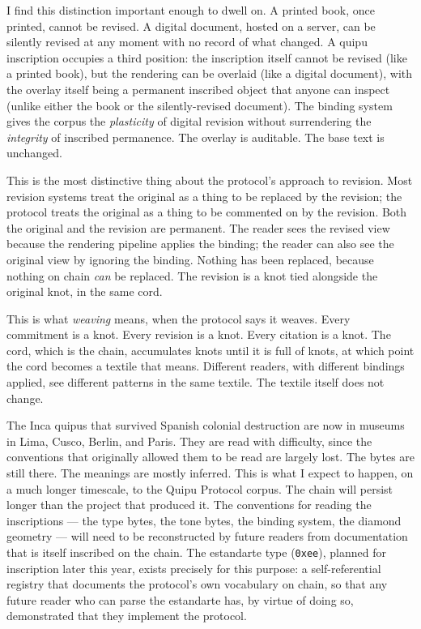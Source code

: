 \documentclass[11pt,openany]{book}
\begin{document}
I find this distinction important enough to dwell on. A printed book, once printed, cannot be revised. A digital document, hosted on a server, can be silently revised at any moment with no record of what changed. A quipu inscription occupies a third position: the inscription itself cannot be revised (like a printed book), but the rendering can be overlaid (like a digital document), with the overlay itself being a permanent inscribed object that anyone can inspect (unlike either the book or the silently-revised document). The binding system gives the corpus the \emph{plasticity} of digital revision without surrendering the \emph{integrity} of inscribed permanence. The overlay is auditable. The base text is unchanged.

This is the most distinctive thing about the protocol's approach to revision. Most revision systems treat the original as a thing to be replaced by the revision; the protocol treats the original as a thing to be commented on by the revision. Both the original and the revision are permanent. The reader sees the revised view because the rendering pipeline applies the binding; the reader can also see the original view by ignoring the binding. Nothing has been replaced, because nothing on chain \emph{can} be replaced. The revision is a knot tied alongside the original knot, in the same cord.

This is what \emph{weaving} means, when the protocol says it weaves. Every commitment is a knot. Every revision is a knot. Every citation is a knot. The cord, which is the chain, accumulates knots until it is full of knots, at which point the cord becomes a textile that means. Different readers, with different bindings applied, see different patterns in the same textile. The textile itself does not change.

The Inca quipus that survived Spanish colonial destruction are now in museums in Lima, Cusco, Berlin, and Paris. They are read with difficulty, since the conventions that originally allowed them to be read are largely lost. The bytes are still there. The meanings are mostly inferred. This is what I expect to happen, on a much longer timescale, to the Quipu Protocol corpus. The chain will persist longer than the project that produced it. The conventions for reading the inscriptions — the type bytes, the tone bytes, the binding system, the diamond geometry — will need to be reconstructed by future readers from documentation that is itself inscribed on the chain. The estandarte type (\texttt{0xee}), planned for inscription later this year, exists precisely for this purpose: a self-referential registry that documents the protocol's own vocabulary on chain, so that any future reader who can parse the estandarte has, by virtue of doing so, demonstrated that they implement the protocol.
\end{document}
